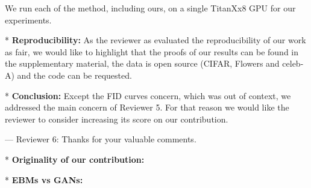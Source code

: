 \documentclass{article}
\begin{document}
We run each of the method, including ours, on a single TitanXx8 GPU for our experiments.

* \textbf{Reproducibility:} As the reviewer as evaluated the reproducibility of our work as fair, we would like to highlight that the proofs of our results can be found in the supplementary material, the data is open source (CIFAR, Flowers and celeb-A) and the code can be requested.

* \textbf{Conclusion:} Except the FID curves concern, which was out of context, we addressed the main concern of Reviewer 5. For that reason we would like the reviewer to consider increasing its score on our contribution.

--- Reviewer 6: Thanks for your valuable comments.

* \textbf{Originality of our contribution:} 

* \textbf{EBMs vs GANs:} 
\end{document}
